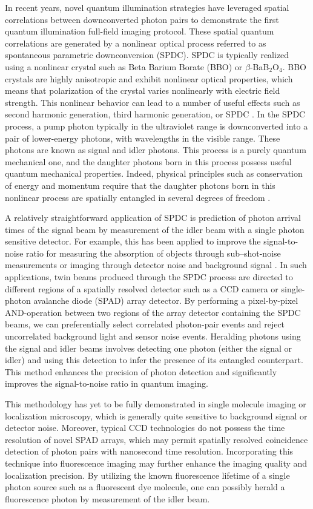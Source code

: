 In recent years, novel quantum illumination strategies have leveraged spatial correlations between downconverted photon pairs to demonstrate the first quantum illumination full-field imaging protocol. These spatial quantum correlations are generated by a nonlinear optical process referred to as spontaneous parametric downconversion (SPDC). SPDC is typically realized using a nonlinear crystal such as Beta Barium Borate (BBO) or $\beta$-BaB$_2$O$_4$. BBO crystals are highly anisotropic and exhibit nonlinear optical properties, which means that polarization of the crystal varies nonlinearly with electric field strength. This nonlinear behavior can lead to a number of useful effects such as second harmonic generation, third harmonic generation, or SPDC \parencite{Boyd2020}. In the SPDC process, a pump photon typically in the ultraviolet range is downconverted into a pair of lower-energy photons, with wavelengths in the visible range. These photons are known as signal and idler photons. This process is a purely quantum mechanical one, and the daughter photons born in this process possess useful quantum mechanical properties. Indeed, physical principles such as conservation of energy and momentum require that the daughter photons born in this nonlinear process are spatially entangled in several degrees of freedom \parencite{Boyd2020}. 


A relatively straightforward application of SPDC is prediction of photon arrival times of the signal beam by measurement of the idler beam with a single photon sensitive detector. For example, this has been applied to improve the signal-to-noise ratio for measuring the absorption of objects through sub–shot-noise measurements \parencite{Brida2010} or imaging through detector noise and background signal \parencite{Gregory2020,Wolley2022}. In such applications, twin beams produced through the SPDC process are directed to different regions of a spatially resolved detector such as a CCD camera or single-photon avalanche diode (SPAD) array detector. By performing a pixel-by-pixel AND-operation between two regions of the array detector containing the SPDC beams, we can preferentially select correlated photon-pair events and reject uncorrelated background light and sensor noise events. Heralding photons using the signal and idler beams involves detecting one photon (either the signal or idler) and using this detection to infer the presence of its entangled counterpart. This method enhances the precision of photon detection and significantly improves the signal-to-noise ratio in quantum imaging.

This methodology has yet to be fully demonstrated in single molecule imaging or localization microscopy, which is generally quite sensitive to background signal or detector noise. Moreover, typical CCD	 technologies do not possess the time resolution of novel SPAD arrays, which may permit spatially resolved coincidence detection of photon pairs with nanosecond time resolution. Incorporating this technique into fluorescence imaging may further enhance the imaging quality and localization precision. By utilizing the known fluorescence lifetime of a single photon source such as a fluorescent dye molecule, one can possibly herald a fluorescence photon by measurement of the idler beam.

